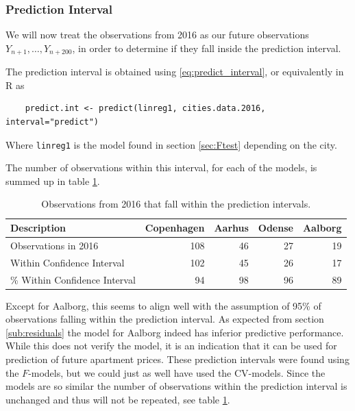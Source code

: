 \subsubsection{Prediction Interval}
We will now treat the observations from 2016 as our future observations $Y_{n+1}, \ldots, Y_{n+200}$, in order to determine if they fall inside the prediction interval.

The prediction interval is obtained using \eqref{eq:predict_interval}, or equivalently in R as
\begin{lstlisting}
    predict.int <- predict(linreg1, cities.data.2016, interval="predict")
\end{lstlisting}
Where \texttt{linreg1} is the model found in section \ref{sec:Ftest} depending on the city. 

The number of observations within this interval, for each of the models, is summed up in table \ref{tbl:Within_prediction_interval}. 
\begin{table}[H]
    \centering
    \begin{tabular}{l|rrrr}
        \toprule
        \textbf{Description} & \textbf{Copenhagen} & \textbf{Aarhus} & \textbf{Odense} & \textbf{Aalborg}\\
        \midrule
        Observations in 2016 & 108              & 46         & 27            & 19 \\
        Within Confidence Interval & 102           & 45            & 26        & 17 \\
        \% Within Confidence Interval & 94    & 98  & 96  & 89 \\
        \bottomrule
    \end{tabular}
    \caption{Observations from 2016 that fall within the prediction intervals.}
    \label{tbl:Within_prediction_interval}
\end{table}
Except for Aalborg, this seems to align well with the assumption of 95\% of observations falling within the prediction interval.
As expected from section \ref{sub:residuals} the model for Aalborg indeed has inferior predictive performance. 
While this does not verify the model, it is an indication that it can be used for prediction of future apartment prices.
These prediction intervals were found using the $F$-models, but we could just as well have used the CV-models. 
Since the models are so similar the number of observations within the prediction interval is unchanged and thus will not be repeated, see table \ref{tbl:Within_prediction_interval}.

